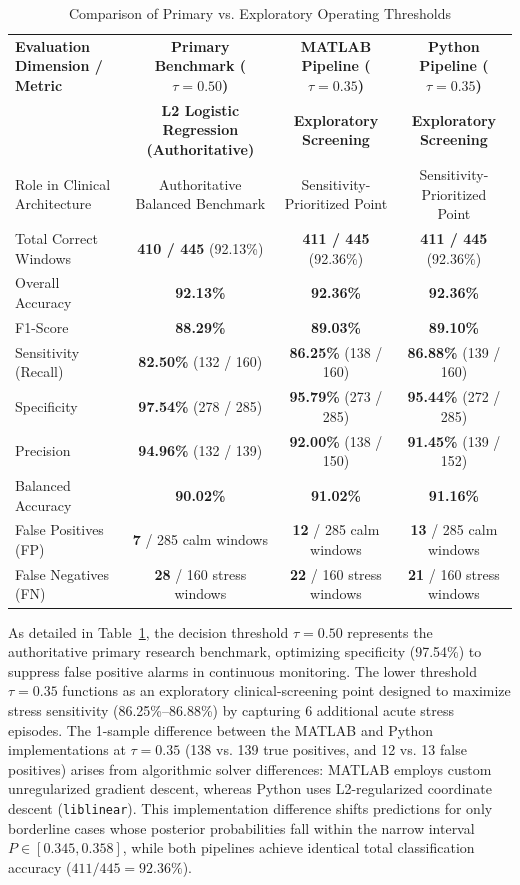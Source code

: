 \documentclass[conference]{IEEEtran}
\begin{document}
\begin{table}[t]
\centering
\caption{Comparison of Primary vs. Exploratory Operating Thresholds}
\label{tab:threshold_comparison}
\small
\begin{tabular*}{\textwidth}{@{\extracolsep{\fill}}lccc@{}}
\toprule
\textbf{Evaluation Dimension / Metric} & \textbf{Primary Benchmark ($\tau = 0.50$)} & \textbf{MATLAB Pipeline ($\tau = 0.35$)} & \textbf{Python Pipeline ($\tau = 0.35$)} \\
 & \textbf{L2 Logistic Regression (Authoritative)} & \textbf{Exploratory Screening} & \textbf{Exploratory Screening} \\
\midrule
Role in Clinical Architecture & Authoritative Balanced Benchmark & Sensitivity-Prioritized Point & Sensitivity-Prioritized Point \\
Total Correct Windows & \textbf{410 / 445} (92.13\%) & \textbf{411 / 445} (92.36\%) & \textbf{411 / 445} (92.36\%) \\
Overall Accuracy & \textbf{92.13\%} & \textbf{92.36\%} & \textbf{92.36\%} \\
F1-Score & \textbf{88.29\%} & \textbf{89.03\%} & \textbf{89.10\%} \\
Sensitivity (Recall) & \textbf{82.50\%} (132 / 160) & \textbf{86.25\%} (138 / 160) & \textbf{86.88\%} (139 / 160) \\
Specificity & \textbf{97.54\%} (278 / 285) & \textbf{95.79\%} (273 / 285) & \textbf{95.44\%} (272 / 285) \\
Precision & \textbf{94.96\%} (132 / 139) & \textbf{92.00\%} (138 / 150) & \textbf{91.45\%} (139 / 152) \\
Balanced Accuracy & \textbf{90.02\%} & \textbf{91.02\%} & \textbf{91.16\%} \\
False Positives (FP) & \textbf{7} / 285 calm windows & \textbf{12} / 285 calm windows & \textbf{13} / 285 calm windows \\
False Negatives (FN) & \textbf{28} / 160 stress windows & \textbf{22} / 160 stress windows & \textbf{21} / 160 stress windows \\
\bottomrule
\end{tabular*}
\end{table}

As detailed in Table~\ref{tab:threshold_comparison}, the decision threshold $\tau = 0.50$ represents the authoritative primary research benchmark, optimizing specificity (97.54\%) to suppress false positive alarms in continuous monitoring. The lower threshold $\tau = 0.35$ functions as an exploratory clinical-screening point designed to maximize stress sensitivity (86.25\%--86.88\%) by capturing 6 additional acute stress episodes. The 1-sample difference between the MATLAB and Python implementations at $\tau = 0.35$ (138 vs. 139 true positives, and 12 vs. 13 false positives) arises from algorithmic solver differences: MATLAB employs custom unregularized gradient descent, whereas Python uses L2-regularized coordinate descent (\texttt{liblinear}). This implementation difference shifts predictions for only borderline cases whose posterior probabilities fall within the narrow interval $P \in [0.345, 0.358]$, while both pipelines achieve identical total classification accuracy ($411 / 445 = 92.36\%$).
\end{document}
